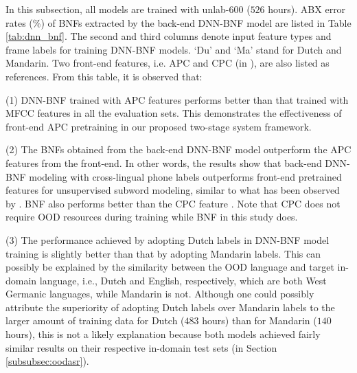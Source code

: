 \documentclass[a4paper]{article}
\begin{document}
In this subsection, all models are trained with unlab-600 ($526$ hours).
ABX error rates (\%) of BNFs extracted by the back-end DNN-BNF model are listed in Table \ref{tab:dnn_bnf}. The second and third columns  denote input feature types and frame labels for training DNN-BNF models. `Du' and `Ma' stand for Dutch and Mandarin. 
Two front-end features, i.e. APC and CPC (in \cite{kahn2019librilight}),  are also listed as references.
   From this table, it is observed  that:

(1) DNN-BNF trained with APC features performs better than that trained with MFCC features in all the evaluation sets. This  demonstrates the effectiveness of front-end APC pretraining in our proposed two-stage system framework.

(2) The BNFs obtained from the back-end DNN-BNF model outperform the APC features from the front-end. In other words, the results show that
back-end DNN-BNF modeling with cross-lingual phone labels
outperforms front-end  pretrained features for unsupervised subword modeling, similar to what has been observed by \cite{shibata2017composite,feng2019_TASLP}. BNF also performs better than the   CPC feature    \cite{kahn2019librilight}. Note that CPC does not require OOD resources during training while BNF in this study does.

(3) The performance achieved by adopting Dutch labels in DNN-BNF model training is slightly better than that by adopting Mandarin labels. 
This can possibly be explained by the similarity between the OOD language and target in-domain language, i.e., Dutch and English, respectively, which are both West Germanic languages, while Mandarin is not. 
Although one could 
possibly 
attribute the superiority of adopting Dutch labels over Mandarin labels to the larger amount of training data for Dutch ($483$ hours) than for Mandarin ($140$ hours), this is not a likely explanation because both models achieved fairly similar 
results 
on their respective in-domain test sets (in Section \ref{subsubsec:oodasr}).
\end{document}
